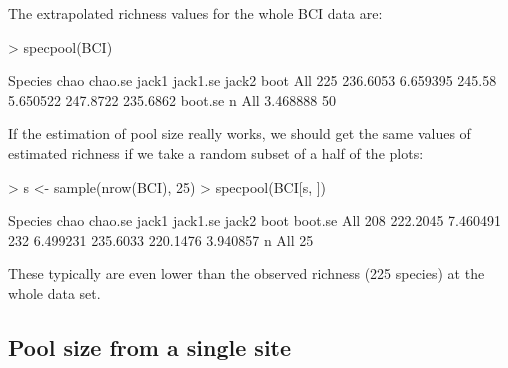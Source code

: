 \documentclass[a4paper,10pt]{amsart}
\begin{document}
The extrapolated richness values for the whole BCI data are:
\begin{Schunk}
\begin{Sinput}
> specpool(BCI)
\end{Sinput}
\begin{Soutput}
    Species     chao  chao.se  jack1 jack1.se    jack2     boot
All     225 236.6053 6.659395 245.58 5.650522 247.8722 235.6862
     boot.se  n
All 3.468888 50
\end{Soutput}
\end{Schunk}
If the estimation of pool size really works, we should get the same
values of estimated richness if we take a random subset of a half of
the plots:
\begin{Schunk}
\begin{Sinput}
> s <- sample(nrow(BCI), 25)
> specpool(BCI[s, ])
\end{Sinput}
\begin{Soutput}
    Species     chao  chao.se jack1 jack1.se    jack2     boot  boot.se
All     208 222.2045 7.460491   232 6.499231 235.6033 220.1476 3.940857
     n
All 25
\end{Soutput}
\end{Schunk}
These typically are even lower than the observed richness
(225 species) at the whole data set.

\subsection{Pool size from a single site}
\end{document}
